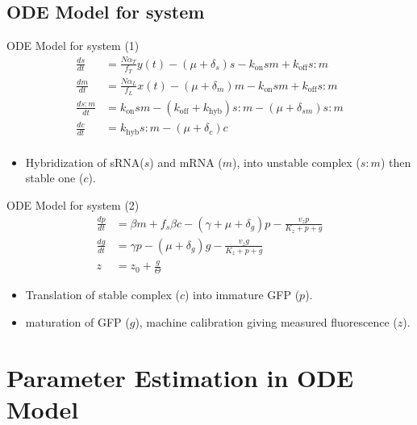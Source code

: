 \documentclass{beamer}
\begin{document}
\subsection{ODE Model for system}
\begin{frame}{ODE Model for system (1)}{}
\begin{align*} 
\frac{ds}{dt} &= \frac{N\alpha_{T}}{f_{T}} y(t)-(\mu + \delta_{s})s -k_{\mathrm{on}}sm +k_{\mathrm{off}}s:m \\
\frac{dm}{dt} &=  \frac{N\alpha_{L}}{f_{L}}x(t)-(\mu + \delta_{m})m -k_{\mathrm{on}}sm +k_{\mathrm{off}}s:m  \\
\frac{ds:m}{dt} & = k_{\mathrm{on}}sm  - (k_{\mathrm{off}}+ k_{\mathrm{hyb}})s:m  -(\mu + \delta_{sm} )s:m \\
\frac{dc}{dt} & = k_{\mathrm{hyb}}s:m  -(\mu + \delta_{c})c  \\
\end{align*}
\vspace{-3em}
  \begin{itemize}
    \item  Hybridization of sRNA($s$) and mRNA ($m$), into unstable complex ($s:m$) then stable one ($c$).
    \end{itemize}
\end{frame}

\begin{frame}{ODE Model for system (2)}{}
\begin{align*} 
\frac{dp}{dt} & = \beta m +f_{s}\beta c -(\gamma + \mu + \delta_{g})p - \frac{v_{z}p}{K_{z}+p+g}   \\
\frac{dg}{dt} & = \gamma p - (\mu + \delta_{g})g - \frac{v_{z}g}{K_{z}+p+g} \\
z &= z_{0} +\frac{g}{\Theta} 
\end{align*}

  \begin{itemize}
    \item Translation of stable complex ($c$) into immature GFP ($p$). 
    \item maturation of GFP ($g$), machine calibration giving measured fluorescence ($z$).
    \end{itemize}

\end{frame}

\section{Parameter Estimation in ODE Model}
\end{document}
